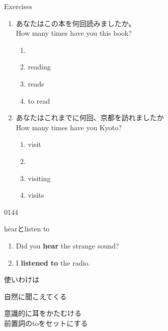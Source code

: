 \documentclass[aspectratio=169,xcolor={dvipsnames,table}]{beamer}
\newcommand{\myaudio}[1]{\href{#1}{\faVolumeUp}}
\begin{document}
\begin{frame}[plain]{Exercises}
 
\begin{enumerate}
    \item あなたはこの本を何回読みましたか。\\
    How many times have you \underline{\hspace{2cm}} this book?
    \begin{enumerate}
        \item {}
        \item reading
        \item reads
        \item to read
    \end{enumerate}

    \item あなたはこれまでに何回、京都を訪れましたか\\
    How many times have you \underline{\hspace{2cm}} Kyoto?
    \begin{enumerate}
        \item visit
        \item {}
        \item visiting
        \item visits
    \end{enumerate}
\end{enumerate}
\hfill{\tiny 0144}\,{\scriptsize \myaudio{./audio/013_have_pp_keiken_061.mp3}}

\end{frame}
\begin{frame}{hearとlisten to}
\large
 \begin{enumerate}
  \item Did you \textbf{hear} the strange sound?
  \item I \textbf{listened to} the radio.
 \end{enumerate}

\bigskip

\pause
使いわけは\pause
\begin{description}[　　　　　　]
 \item[hear] 自然に聞こえてくる\pause
 \item[listen] 意識的に耳をかたむける\\\pause
前置詞のtoをセットにする
\end{description}
\end{frame}
\end{document}

